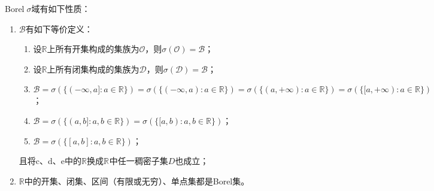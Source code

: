 \begin{property}\label{prop:BorelSigmaField}
	Borel$\;\sigma$域有如下性质：	
	\begin{enumerate}
		\item $\mathcal{B}$有如下等价定义：
		\begin{enumerate}
			\item 设$\mathbb{R}$上所有开集构成的集族为$\mathcal{O}$，则$\sigma(\mathcal{O})=\mathcal{B}$；
			\item 
			设$\mathbb{R}$上所有闭集构成的集族为$\mathcal{D}$，则$\sigma(\mathcal{D})=\mathcal{B}$；
			\item $\mathcal{B}=\sigma(\{(-\infty,a]:a\in\mathbb{R}\})=\sigma(\{(-\infty,a):a\in\mathbb{R}\})=\sigma(\{(a,+\infty):a\in\mathbb{R}\})=\sigma(\{[a,+\infty):a\in\mathbb{R}\})$；
			\item $\mathcal{B}=\sigma(\{(a,b]:a,b\in\mathbb{R}\})=\sigma(\{[a,b):a,b\in\mathbb{R}\})$；
			\item $\mathcal{B}=\sigma(\{[a,b]:a,b\in\mathbb{R}\})$；
		\end{enumerate}
		且将c、d、e中的$\mathbb{R}$换成$\mathbb{R}^{}$中任一稠密子集$D$也成立；
		\item $\mathbb{R}$中的开集、闭集、区间（有限或无穷）、单点集都是Borel集。
	\end{enumerate}
\end{property}
